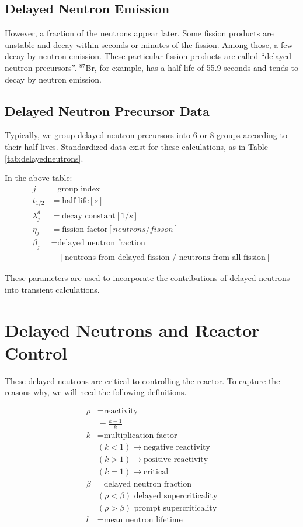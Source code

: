\documentclass[12pt]{article}
\begin{document}
\subsection{Delayed Neutron Emission}
However, a fraction of the neutrons appear later. Some fission products are 
unstable and decay within seconds or minutes of the fission. Among those, a few 
decay by neutron emission. These particular fission products are called ``delayed 
neutron precursors''.  $^{87}$Br, for example, has a half-life of 55.9 seconds 
and tends to decay by neutron emission.

\subsection{Delayed Neutron Precursor Data}
Typically, we group delayed neutron precursors into 6 or 8 groups according to 
their half-lives. Standardized data exist for these calculations, as in Table 
\ref{tab:delayedneutrons}.



In the above table:
\begin{align}
j &= \mbox{group index}\\
t_{1/2} &= \mbox{half life} [s]\\
\lambda_j^d &= \mbox{decay constant} [1/s]\\
\eta_j &= \mbox{fission factor} [neutrons/fisson]\\
\beta_j &= \mbox{delayed neutron fraction} \\&\quad[\text{neutrons from delayed fission / neutrons from all fission}]\nonumber
\end{align}

These parameters are used to incorporate the contributions of delayed neutrons 
into transient calculations.

\section{Delayed Neutrons and Reactor Control}
These delayed neutrons are critical to controlling the reactor. 
To capture the reasons why, we will need the following definitions.

\begin{align}
\rho &= \mbox{reactivity}\\
&= \frac{k-1}{k}\\
k &= \mbox{multiplication factor}\\
&(k < 1) \rightarrow \mbox{negative reactivity}\\
&(k > 1) \rightarrow \mbox{positive reactivity}\\
&(k = 1) \rightarrow \mbox{critical}\\
\beta &= \mbox{delayed neutron fraction}\\
&(\rho < \beta) \mbox{ delayed supercriticality}\\
&(\rho > \beta) \mbox{ prompt supercriticality}\\
l &= \mbox{mean neutron lifetime}
\end{align}
\end{document}
